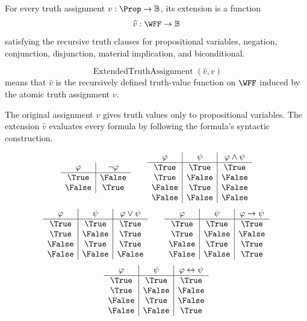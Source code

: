 \begin{remark*}
For every truth assignment \(v:\Prop\to\mathbb{B}\), its extension is a function
\[
\widehat v:\WFF\to\mathbb{B}
\]
satisfying the recursive truth clauses for propositional variables, negation,
conjunction, disjunction, material implication, and biconditional.
\end{remark*}

\begin{remark*}
\[
\operatorname{ExtendedTruthAssignment}(\widehat v,v)
\]
means that \(\widehat v\) is the recursively defined truth-value function on
\(\WFF\) induced by the atomic truth assignment \(v\).
\end{remark*}

\begin{remark*}[Interpretation]
The original assignment \(v\) gives truth values only to propositional variables.
The extension \(\widehat v\) evaluates every formula by following the formula's
syntactic construction.
\end{remark*}

\begin{remark*}[Examples]
\[
\begin{array}{c|c}
\varphi & \neg\varphi\\
\hline
\True & \False\\
\False & \True
\end{array}
\qquad
\begin{array}{c|c|c}
\varphi & \psi & \varphi\land\psi\\
\hline
\True & \True & \True\\
\True & \False & \False\\
\False & \True & \False\\
\False & \False & \False
\end{array}
\]
\[
\begin{array}{c|c|c}
\varphi & \psi & \varphi\lor\psi\\
\hline
\True & \True & \True\\
\True & \False & \True\\
\False & \True & \True\\
\False & \False & \False
\end{array}
\qquad
\begin{array}{c|c|c}
\varphi & \psi & \varphi\to\psi\\
\hline
\True & \True & \True\\
\True & \False & \False\\
\False & \True & \True\\
\False & \False & \True
\end{array}
\]
\[
\begin{array}{c|c|c}
\varphi & \psi & \varphi\leftrightarrow\psi\\
\hline
\True & \True & \True\\
\True & \False & \False\\
\False & \True & \False\\
\False & \False & \True
\end{array}
\]
\end{remark*}


